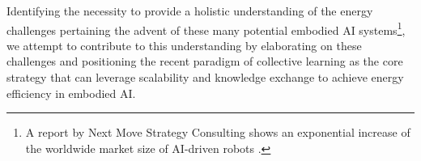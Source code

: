 Identifying the necessity to provide a holistic understanding of the energy challenges pertaining the advent of these many potential embodied AI systems\footnote{A report by Next Move Strategy Consulting shows an exponential increase of the worldwide market size of AI-driven robots \cite{statista_ai_robots_market_size}.}, we attempt to contribute to this understanding by elaborating on these challenges and positioning the recent paradigm of collective learning as the core strategy that can leverage scalability and knowledge exchange to achieve energy efficiency in embodied AI.